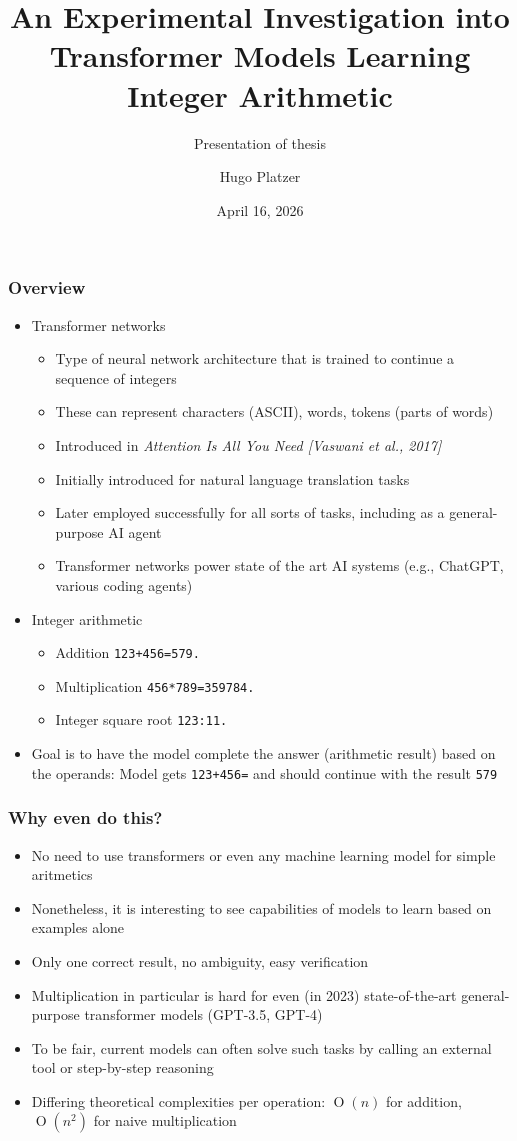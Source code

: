 \documentclass{beamer}
\title{An Experimental Investigation into Transformer Models Learning Integer Arithmetic}
\subtitle{Presentation of thesis}
\author{Hugo Platzer}
\date{April 16, 2026}
\begin{document}
\frame{\titlepage}

\begin{frame}
\frametitle{Overview}

\begin{itemize}
    \item Transformer networks
    \begin{itemize}
        \item Type of neural network architecture that is trained to continue a sequence of integers
        \item These can represent characters (ASCII), words, tokens (parts of words)
        \item Introduced in \textit{Attention Is All You Need [Vaswani et al., 2017]}
        \item Initially introduced for natural language translation tasks
        \item Later employed successfully for all sorts of tasks, including as a general-purpose AI agent
        \item Transformer networks power state of the art AI systems (e.g., ChatGPT, various coding agents)
    \end{itemize}
    \item Integer arithmetic
    \begin{itemize}
        \item Addition \texttt{123+456=579.}
        \item Multiplication \texttt{456*789=359784.}
        \item Integer square root \texttt{123:11.}
    \end{itemize}
    \item Goal is to have the model complete the answer (arithmetic result)
    based on the operands: Model gets \texttt{123+456=} and should continue with the result
    \texttt{579}
\end{itemize}
\end{frame}

\begin{frame}
\frametitle{Why even do this?}
\begin{itemize}
    \item No need to use transformers or even any machine learning model for simple aritmetics
    \item Nonetheless, it is interesting to see capabilities of models to learn based on examples alone
    \item Only one correct result, no ambiguity, easy verification
    \item Multiplication in particular is hard for even (in 2023) state-of-the-art general-purpose transformer models (GPT-3.5, GPT-4)
    \item To be fair, current models can often solve such tasks by calling an external tool or step-by-step reasoning
    \item Differing theoretical complexities per operation: $\operatorname{O}(n)$ for addition, $\operatorname{O}(n^2)$ for naive multiplication
\end{itemize}
\end{frame}
\end{document}

